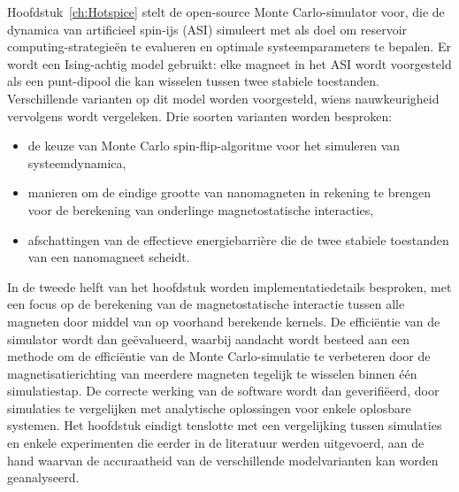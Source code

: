 Hoofdstuk~\ref{ch:Hotspice} stelt de open-source \hotspice Monte Carlo-simulator voor, die de dynamica van artificieel spin-ijs (ASI) simuleert met als doel om reservoir computing-strategie\"en te evalueren en optimale systeemparameters te bepalen.
Er wordt een Ising-achtig model gebruikt: elke magneet in het ASI wordt voorgesteld als een punt-dipool die kan wisselen tussen twee stabiele toestanden.
Verschillende varianten op dit model worden voorgesteld, wiens nauwkeurigheid vervolgens wordt vergeleken. %
Drie soorten varianten worden besproken:
\begin{itemize}[noitemsep,nolistsep] %
	\item de keuze van Monte Carlo spin-flip-algoritme voor het simuleren van systeemdynamica,
	\item manieren om de eindige grootte van nanomagneten in rekening te brengen voor de berekening van onderlinge magnetostatische interacties,
	\item afschattingen van de effectieve energiebarri\`ere die de twee stabiele toestanden van een nanomagneet scheidt.
\end{itemize}
In de tweede helft van het hoofdstuk worden implementatiedetails besproken, met een focus op de berekening van de magnetostatische interactie tussen alle magneten door middel van op voorhand berekende kernels.
De effici\"entie van de simulator wordt dan ge\"evalueerd, waarbij aandacht wordt besteed aan een methode om de effici\"entie van de Monte Carlo-simulatie te verbeteren door de magnetisatierichting van meerdere magneten tegelijk te wisselen binnen \'e\'en simulatiestap.
De correcte werking van de software wordt dan geverifi\"eerd, door simulaties te vergelijken met analytische oplossingen voor enkele oplosbare systemen.
Het hoofdstuk eindigt tenslotte met een vergelijking tussen simulaties en enkele experimenten die eerder in de literatuur werden uitgevoerd, aan de hand waarvan de accuraatheid van de verschillende modelvarianten kan worden geanalyseerd. \\

